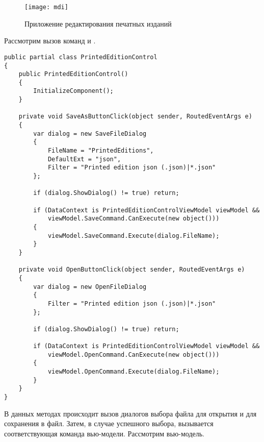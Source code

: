 \documentclass[a4paper,14pt]{extarticle}
\begin{document}
\begin{figure}[H]
    \centering
    \texttt{[image: mdi]}
    \caption{Приложение редактирования печатных изданий}
    \label{fig:mdi}
\end{figure}

Рассмотрим вызов команд  и .

\begin{lstlisting}
public partial class PrintedEditionControl
{
    public PrintedEditionControl()
    {
        InitializeComponent();
    }

    private void SaveAsButtonClick(object sender, RoutedEventArgs e)
    {
        var dialog = new SaveFileDialog
        {
            FileName = "PrintedEditions",
            DefaultExt = "json",
            Filter = "Printed edition json (.json)|*.json"
        };

        if (dialog.ShowDialog() != true) return;

        if (DataContext is PrintedEditionControlViewModel viewModel &&
            viewModel.SaveCommand.CanExecute(new object()))
        {
            viewModel.SaveCommand.Execute(dialog.FileName);
        }
    }

    private void OpenButtonClick(object sender, RoutedEventArgs e)
    {
        var dialog = new OpenFileDialog
        {
            Filter = "Printed edition json (.json)|*.json"
        };

        if (dialog.ShowDialog() != true) return;

        if (DataContext is PrintedEditionControlViewModel viewModel &&
            viewModel.OpenCommand.CanExecute(new object()))
        {
            viewModel.OpenCommand.Execute(dialog.FileName);
        }
    }
}
\end{lstlisting}

В данных методах происходит вызов диалогов выбора файла для открытия и для
сохранения в файл. Затем, в случае успешного выбора, вызывается соответствующая
команда вью-модели. Рассмотрим вью-модель.
\end{document}
